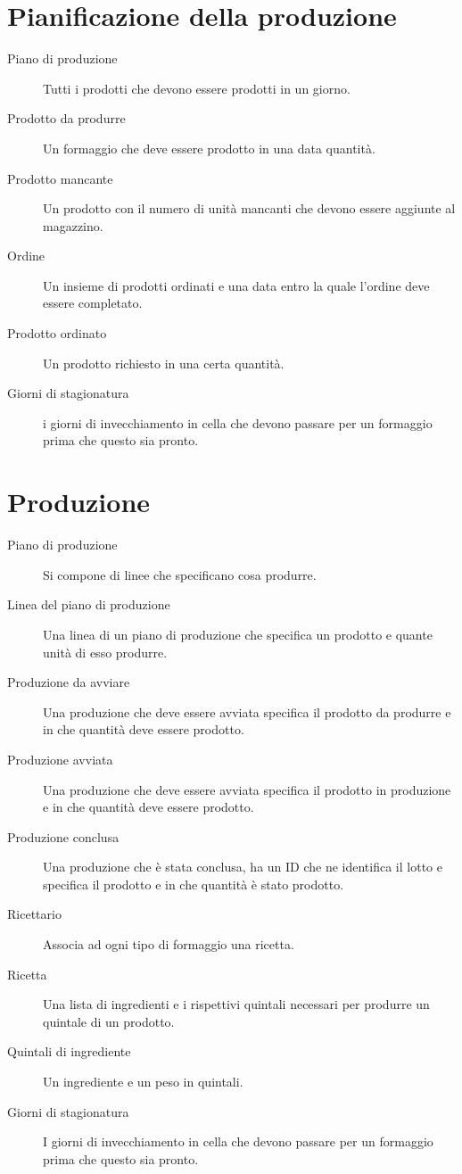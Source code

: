 \section{Pianificazione della produzione}
\begin{description}
    \item [Piano di produzione] Tutti i prodotti che devono essere prodotti in un giorno.
    \item [Prodotto da produrre] Un formaggio che deve essere prodotto in una data quantità.
    \item [Prodotto mancante] Un prodotto con il numero di unità mancanti che devono essere aggiunte al magazzino.
    \item [Ordine] Un insieme di prodotti ordinati e una data entro la quale l'ordine deve essere completato.
    \item [Prodotto ordinato] Un prodotto richiesto in una certa quantità.
    \item [Giorni di stagionatura] i giorni di invecchiamento in cella che devono passare per un formaggio prima che questo sia pronto.
\end{description}

\section{Produzione}
\begin{description}
    \item [Piano di produzione] Si compone di linee che specificano cosa produrre.
    \item [Linea del piano di produzione] Una linea di un piano di produzione che specifica un prodotto e quante unità di esso produrre.
    \item [Produzione da avviare] Una produzione che deve essere avviata specifica il prodotto da produrre e in che quantità deve essere prodotto.
    \item [Produzione avviata] Una produzione che deve essere avviata specifica il prodotto in produzione e in che quantità deve essere prodotto.
    \item [Produzione conclusa] Una produzione che è stata conclusa, ha un ID che ne identifica il lotto e specifica il prodotto e in che quantità è stato prodotto.
    \item [Ricettario] Associa ad ogni tipo di formaggio una ricetta.
    \item [Ricetta] Una lista di ingredienti e i rispettivi quintali necessari per produrre un quintale di un prodotto.
    \item [Quintali di ingrediente] Un ingrediente e un peso in quintali.
    \item [Giorni di stagionatura] I giorni di invecchiamento in cella che devono passare per un formaggio prima che questo sia pronto.
\end{description}

